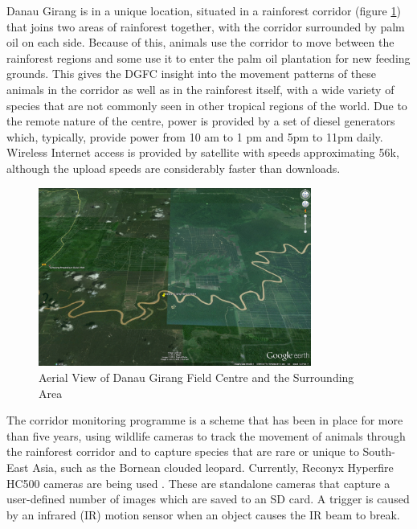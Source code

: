Danau Girang is in a unique location, situated in a rainforest corridor (figure \ref{tech:fig:map}) that joins two areas of rainforest together, with the corridor surrounded by palm oil on each side. Because of this, animals use the corridor to move between the rainforest regions and some use it to enter the palm oil plantation for new feeding grounds. This gives the DGFC insight into the movement patterns of these animals in the corridor as well as in the rainforest itself, with a wide variety of species that are not commonly seen in other tropical regions of the world. Due to the remote nature of the centre, power is provided by a set of diesel generators which, typically, provide power from 10 am to 1 pm and 5pm to 11pm daily. Wireless Internet access is provided by satellite with speeds approximating 56k, although the upload speeds are considerably faster than downloads.

		\begin{figure}[h]
		\centering
		\includegraphics[width=0.8\textwidth]{Chap3/figures/dgmap}
		\caption{Aerial View of Danau Girang Field Centre and the Surrounding Area}
		\label{tech:fig:map}
		\end{figure}

The corridor monitoring programme is a scheme that has been in place for more than five years, using wildlife cameras to track the movement of animals through the rainforest corridor and to capture species that are rare or unique to South-East Asia, such as the Bornean clouded leopard. Currently, Reconyx Hyperfire HC500 cameras are being used \cite{Reconyx}. These are standalone cameras that capture a user-defined number of images which are saved to an SD card. A trigger is caused by an infrared (IR) motion sensor when an object causes the IR beam to break. 
	
